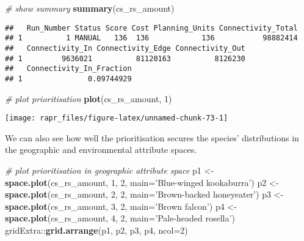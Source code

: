 \documentclass[11pt,]{article}
\newenvironment{Shaded}{\begin{snugshade}}{\end{snugshade}}
\newcommand{\KeywordTok}[1]{\textcolor[rgb]{0.13,0.29,0.53}{\textbf{{#1}}}}
\newcommand{\DataTypeTok}[1]{\textcolor[rgb]{0.13,0.29,0.53}{{#1}}}
\newcommand{\DecValTok}[1]{\textcolor[rgb]{0.00,0.00,0.81}{{#1}}}
\newcommand{\StringTok}[1]{\textcolor[rgb]{0.31,0.60,0.02}{{#1}}}
\newcommand{\CommentTok}[1]{\textcolor[rgb]{0.56,0.35,0.01}{\textit{{#1}}}}
\newcommand{\NormalTok}[1]{{#1}}
\let\origfigure\figure
\let\endorigfigure\endfigure
\renewenvironment{figure}[1][2] {
	\expandafter\origfigure\expandafter[H]
} {
	\endorigfigure
}
\begin{document}
\begin{Shaded}
\begin{Highlighting}[]
\CommentTok{# show summary}
\KeywordTok{summary}\NormalTok{(cs_rs_amount)}
\end{Highlighting}
\end{Shaded}

\begin{verbatim}
##   Run_Number Status Score Cost Planning_Units Connectivity_Total
## 1          1 MANUAL   136  136            136           98882414
##   Connectivity_In Connectivity_Edge Connectivity_Out
## 1         9636021          81120163          8126230
##   Connectivity_In_Fraction
## 1               0.09744929
\end{verbatim}

\begin{Shaded}
\begin{Highlighting}[]
\CommentTok{# plot prioritisation}
\KeywordTok{plot}\NormalTok{(cs_rs_amount, }\DecValTok{1}\NormalTok{)}
\end{Highlighting}
\end{Shaded}

\begin{figure}

{\centering \texttt{[image: rapr\_files/figure-latex/unnamed-chunk-73-1]} 

}

\caption{Multi-species prioritisation generated for four bird species using amount-based targets (20\%). See Figure 12 captions for conventions.}\label{fig:unnamed-chunk-73}
\end{figure}

We can also see how well the prioritisation secures the species'
distributions in the geographic and environmental attribute spaces.

\begin{Shaded}
\begin{Highlighting}[]
\CommentTok{# plot prioritisation in geographic attribute space}
\NormalTok{p1 <-}\StringTok{ }\KeywordTok{space.plot}\NormalTok{(cs_rs_amount, }\DecValTok{1}\NormalTok{, }\DecValTok{2}\NormalTok{, }\DataTypeTok{main=}\StringTok{'Blue-winged kookaburra'}\NormalTok{)}
\NormalTok{p2 <-}\StringTok{ }\KeywordTok{space.plot}\NormalTok{(cs_rs_amount, }\DecValTok{2}\NormalTok{, }\DecValTok{2}\NormalTok{, }\DataTypeTok{main=}\StringTok{'Brown-backed honeyeater'}\NormalTok{)}
\NormalTok{p3 <-}\StringTok{ }\KeywordTok{space.plot}\NormalTok{(cs_rs_amount, }\DecValTok{3}\NormalTok{, }\DecValTok{2}\NormalTok{, }\DataTypeTok{main=}\StringTok{'Brown falcon'}\NormalTok{)}
\NormalTok{p4 <-}\StringTok{ }\KeywordTok{space.plot}\NormalTok{(cs_rs_amount, }\DecValTok{4}\NormalTok{, }\DecValTok{2}\NormalTok{, }\DataTypeTok{main=}\StringTok{'Pale-headed rosella'}\NormalTok{)}
\NormalTok{gridExtra::}\KeywordTok{grid.arrange}\NormalTok{(p1, p2, p3, p4, }\DataTypeTok{ncol=}\DecValTok{2}\NormalTok{)}
\end{Highlighting}
\end{Shaded}
\end{document}
